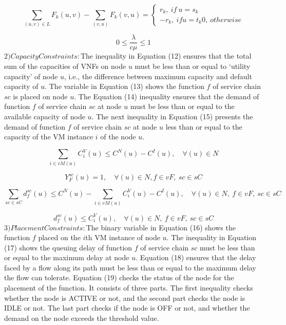 \documentclass[12pt]{article}
\begin{document}
\begin{equation}
\sum_{(u,v)\in L}F_k(u,v)-\sum_{(v,u)}F_k(v,u)=\begin{cases}
								r_k,\ if \ u=s_k\\
								-r_k,\ if u=t_k
								0,\ otherwise
								\end{cases}
\end{equation}


\begin{equation}
0  \leq \frac{\lambda}{c\mu} \leq 1
\end{equation}
$2)Capacity Constraints:$The inequality in Equation (12)
ensures that the total sum of the capacities of VNFs on node $u$
must be less than or equal to ‘utility capacity’ of node $u$, i.e.,
the difference between maximum capacity and default
capacity of $u$. The variable in Equation (13) shows the
function $f$ of service chain $sc$ is placed on node $u$. The
Equation (14) inequality ensures that the demand of function $f$
of service chain $sc$ at node $u$ must be less than or equal to the
available capacity of node $u$. The next inequality in Equation
(15) presents the demand of function $f$ of service chain $sc$ at
node $u$ less than or equal to the capacity of the VM instance $i$
of the node $u$.

\begin{equation}
\sum_{i \in vM(u)} C_i^V(u) \leq C^N(u)-C^I(u),\quad \forall (u) \in N
\end{equation}

\begin{equation}
Y_F^{sc}(u) =1,\quad \forall (u) \in N,f \in vF,\ sc \in sC
\end{equation}

\begin{equation}
\sum_{sc \in sC} d_f^{sc}(u) \leq C^N(u)-\sum_{i \in vM(u)} C_i^V(u)-C^I(u),\quad \forall (u) \in N,\ f \in vF,\ sc \in sC
\end{equation}

\begin{equation}
d_f^{sc}(u)\leq C_i^V(u),\quad \forall (u) \in N,\ f \in vF,\ sc \in sC
\end{equation}
$3) Placement Constraints:$The binary variable in Equation
(16) shows the function $f$ placed on the $i$th VM instance of
node $u$. The inequality in Equation (17) shows the queuing
delay of function $f$ of service chain $sc$ must be less than or
equal to the maximum delay at node $u$. Equation (18) ensures
that the delay faced by a flow along its path must be less than
or equal to the maximum delay the flow can tolerate. Equation
(19) checks the status of the node for the placement of the
function. It consists of three parts. The first inequality checks
whether the node is ACTIVE or not, and the  second part
checks the node is IDLE or not. The last part checks if the
node is OFF or not, and whether the demand on the node
exceeds the threshold value.
\end{document}
